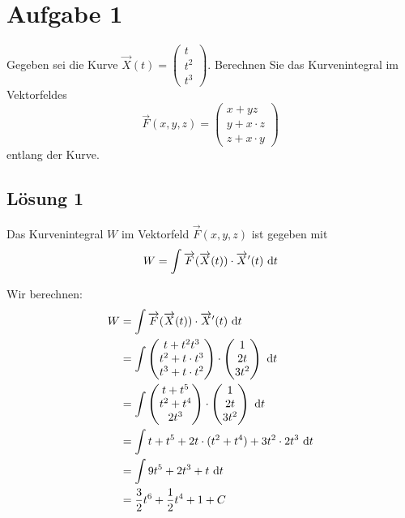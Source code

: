 \documentclass[main.tex]{subfiles}
\begin{document}
\section{Aufgabe 1}
Gegeben sei die Kurve 
$\vec{X}(t) = \begin{pmatrix} t \\ t^2 \\ t^3 \end{pmatrix}$.
Berechnen Sie das Kurvenintegral im Vektorfeldes
\[
\vec{F}(x,y,z) 
= \begin{pmatrix} x + yz \\ y + x \cdot z \\ z + x \cdot y \end{pmatrix}
\]
entlang der Kurve.

\subsection{Lösung 1}

Das Kurvenintegral $W$ im Vektorfeld $\vec{F}(x,y,z)$ ist gegeben mit
\begin{equation*}
    W = \int \overrightarrow{F}(\overrightarrow{X}(t)) \cdot \overrightarrow{X}'(t) ~\mathrm{d}t
\end{equation*}

Wir berechnen:
\begin{align*}
    W &= \int \overrightarrow{F}(\overrightarrow{X}(t)) \cdot \overrightarrow{X}'(t) ~\mathrm{d}t \\
      &= \int \begin{pmatrix} t + t^2t^3 \\ t^2 + t \cdot t^3 \\ t^3 + t \cdot t^2 \end{pmatrix}
          \cdot \begin{pmatrix} 1 \\ 2t \\ 3t^2 \end{pmatrix} ~\mathrm{d}t \\
      &= \int \begin{pmatrix} t + t^5 \\ t^2 + t^4 \\ 2t^3 \end{pmatrix}
          \cdot \begin{pmatrix} 1 \\ 2t \\ 3t^2 \end{pmatrix} ~\mathrm{d}t \\
      &= \int t + t^5 + 2t \cdot ( t^2 + t^4 ) + 3t^2 \cdot 2t^3 ~\mathrm{d}t \\
      &= \int 9t^5 + 2t^3 + t ~\mathrm{d}t \\
      &= \frac{3}{2} t^6 + \frac{1}{2} t^4 + 1 + C \\
\end{align*}
\end{document}
